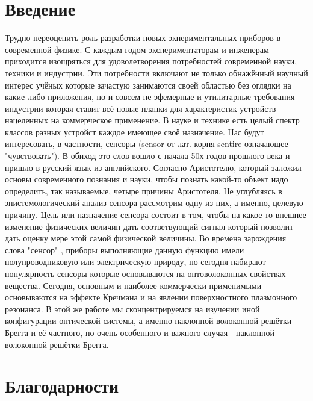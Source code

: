 

\section*{Введение}\label{intro}

Трудно переоценить роль разработки новых экпериментальных приборов в современной физике. С каждым годом экспериментаторам и инженерам приходится изощряться для удоволетворения потребностей современной науки, техники и индустрии. Эти потребности включают не только обнажённый научный интерес учёных которые зачастую занимаются своей областью без оглядки на какие-либо приложения, но и совсем не эфемерные и утилитарные требования индустрии которая ставит всё новые планки для характеристик устройств нацеленных на коммерческое применение. В науке и технике есть целый спектр классов разных устройст каждое имеющее своё назначение. Нас будут интересовать, в частности, сенсоры (sensor от лат. корня sentire означающее "чувствовать"). В обиход это слов вошло с начала 50х годов  прошлого века
и пришло в русский язык из английского. Согласно Аристотелю, который заложил основы современного познания и науки, чтобы познать какой-то объект надо определить, так называемые, четыре причины Аристотеля. Не углубляясь в эпистемологический анализ сенсора рассмотрим одну из них, а именно, целевую причину. Цель или назначение сенсора состоит в том, чтобы на какое-то внешнее изменение физических величин дать соответвующий сигнал который позволит дать оценку мере этой самой физической величины. Во времена зарождения слова "сенсор" , приборы выполняющие данную функцию имели полупроводниковую или электрическую природу, но сегодня набирают популярность сенсоры которые основываются на оптоволоконных свойствах вещества. Сегодня, основным и наиболее коммерчески применимыми основываются на эффекте Кречмана и на явлении поверхностного плазмонного резонанса. В этой же работе мы сконцентрируемся на изучении иной конфигурации оптической системы, а именно наклонной волоконной решётки Брегга и её частного, но очень особенного и важного случая - наклонной волоконной решётки Брегга.


\section*{Благодарности}\label{ty}

